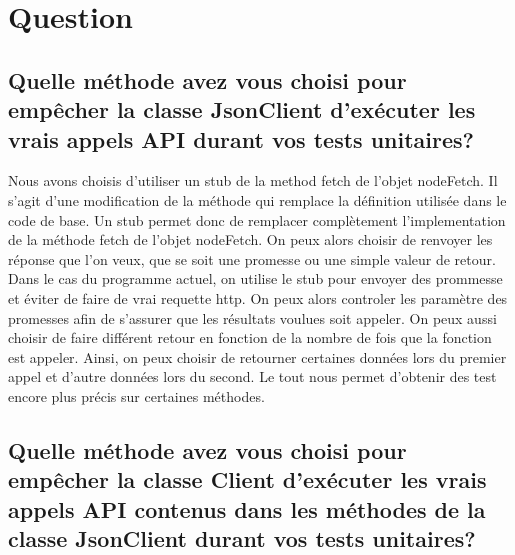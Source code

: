 \documentclass{article}
\begin{document}
\section*{Question}
\subsection*{Quelle méthode avez vous choisi pour empêcher la classe JsonClient d’exécuter
  les vrais appels API durant vos tests unitaires?}
Nous avons choisis d'utiliser un stub de la method fetch de l'objet nodeFetch.
Il s'agit d'une modification de la méthode qui remplace la définition utilisée dans le code de base.
Un stub permet donc de remplacer complètement l'implementation de la méthode fetch de l'objet nodeFetch.
On peux alors choisir de renvoyer les réponse que l'on veux, que se soit une promesse ou une simple valeur de retour.
Dans le cas du programme actuel, on utilise le stub pour envoyer des prommesse et éviter de faire de vrai requette http.
On peux alors controler les paramètre des promesses afin de s'assurer que les résultats voulues soit appeler.
On peux aussi choisir de faire différent retour en fonction de la nombre de fois que la fonction est appeler.
Ainsi, on peux choisir de retourner certaines données lors du premier appel et d'autre données lors du second.
Le tout nous permet d'obtenir des test encore plus précis sur certaines méthodes.
\subsection*{Quelle méthode avez vous choisi pour empêcher la classe Client d’exécuter les
  vrais appels API contenus dans les méthodes de la classe JsonClient durant
  vos tests unitaires?}
\end{document}
